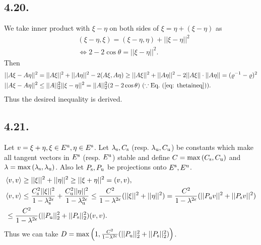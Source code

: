 \documentclass[a4paper,11pt,fleqn]{article}
\begin{document}
\subsection{4.20.}\label{ex: 420}
We take inner product with $\xi-\eta$ on both sides of $\xi=\eta+(\xi-\eta)$ as 
\begin{align}
    &(\xi-\eta,\xi) = (\xi-\eta,\eta)+||\xi-\eta||^2 \nonumber \\
    &\Leftrightarrow 2-2\cos{\theta} = ||\xi-\eta||^2. \label{eq: thetaineq}
\end{align}
Then 
\begin{align}
    &||A\xi - A\eta||^2 = ||A\xi||^2+||A\eta||^2-2(A\xi,A\eta) \ge ||A\xi||^2+||A\eta||^2-2||A\xi||\cdot||A\eta|| = (\varrho^{-1}-\varrho)^2 \\
    &||A\xi - A\eta||^2 \le ||A||_2^2||\xi-\eta||^2=||A||_2^2(2-2\cos{\theta}) \ (\because \text{Eq.~}(\ref{eq: thetaineq})). 
\end{align}
Thus the desired inequality is derived. 
\hruleskip

\subsection{4.21.}\label{ex: 421}
Let $v=\xi+\eta, \xi \in E^{\rm u}, \eta \in E^{\rm s}$. Let $\lambda_{\rm s}, C_{\rm s}$ (resp. $\lambda_{\rm u}, C_{\rm u}$) be constants which make all tangent vectors in $E^{\rm s}$ (resp. $E^{\rm u}$) stable and define $C = \max{(C_{\rm s},C_{\rm u})}$ and $\lambda = \max{(\lambda_{\rm s},\lambda_{\rm u})}$. Also let $P_{\rm s}, P_{\rm u}$ be projections onto $E^{\rm s}, E^{\rm u}$. 
\begin{align}
    &\langle v,v \rangle \ge ||\xi||^2 + ||\eta||^2 \ge ||\xi+\eta||^2 = (v,v), \\
    &\langle v,v \rangle \le \frac{C_{\rm s}^2||\xi||^2}{1-\lambda_{\rm s}^{2\epsilon}} + \frac{C_{\rm u}^2||\eta||^2}{1-\lambda_{\rm u}^{2\epsilon}} \le \frac{C^2}{1-\lambda^{2\epsilon}}(||\xi||^2 + ||\eta||^2) = \frac{C^2}{1-\lambda^{2\epsilon}}(||P_{\rm u}v||^2 + ||P_{\rm s}v||^2) \nonumber \\
    &\le \frac{C^2}{1-\lambda^{2\epsilon}}(||P_{\rm u}||_2^2 + ||P_{\rm s}||_2^2)(v,v). 
\end{align}
Thus we can take $D = \max{\left(1,\frac{C^2}{1-\lambda^{2\epsilon}}(||P_{\rm u}||_2^2 + ||P_{\rm s}||_2^2)\right)}$.
\hruleskip
\end{document}
